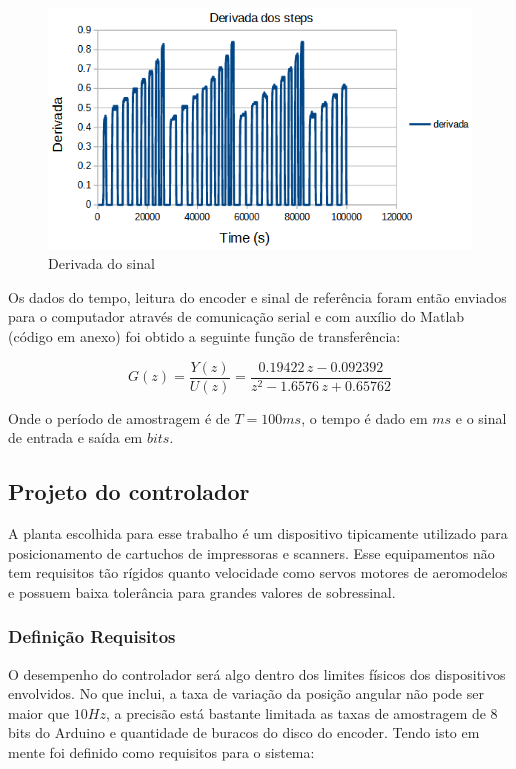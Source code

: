 \documentclass[a4paper,11pt]{article}
\begin{document}
\begin{figure}[H]
    \centering
    \includegraphics[width=\linewidth]{src/tex/img/derivada_steps.PNG} 
    \caption{Derivada do sinal}
    \label{fig:sinal8bits}
\end{figure}


Os dados do tempo, leitura do encoder e sinal de referência foram então enviados para o computador através de comunicação serial e com auxílio do Matlab (código em anexo) foi obtido a seguinte função de transferência:

\begin{equation}
G(z) = \frac{Y(z)}{U(z)} = \frac{0.19422\,z-0.092392}{z^2-1.6576\,z+0.65762}
\label{transfdisc}
\end{equation}

Onde o período de amostragem é de $T = 100 ms$, o tempo é dado em $ms$ e o sinal de entrada e saída em $bits$.

\subsection{Projeto do controlador}

A planta escolhida para esse trabalho é um dispositivo tipicamente utilizado para posicionamento de cartuchos de impressoras e scanners. Esse equipamentos não tem requisitos tão rígidos quanto velocidade como servos motores de aeromodelos e possuem baixa tolerância para grandes valores de sobressinal. 

\subsubsection{Definição Requisitos}

O desempenho do controlador será algo dentro dos limites físicos dos dispositivos envolvidos. No que inclui, a taxa de variação da posição angular não pode ser maior que $10Hz$, a precisão está bastante limitada as taxas de amostragem de 8 bits do Arduino e quantidade de buracos do disco do encoder. Tendo isto em mente foi definido como requisitos para o sistema:
\end{document}
